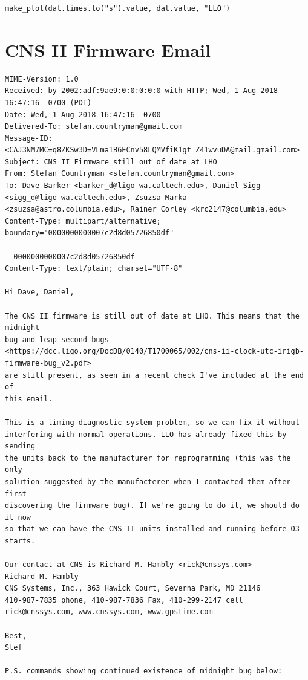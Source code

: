 \documentclass{article}
\begin{document}
\begin{lstlisting}
make_plot(dat.times.to("s").value, dat.value, "LLO")
\end{lstlisting}

\clearpage
\section{CNS II Firmware Email}
\label{sec:cnsiiemail}
\lstset{language=}
\begin{lstlisting}
MIME-Version: 1.0
Received: by 2002:adf:9ae9:0:0:0:0:0 with HTTP; Wed, 1 Aug 2018 16:47:16 -0700 (PDT)
Date: Wed, 1 Aug 2018 16:47:16 -0700
Delivered-To: stefan.countryman@gmail.com
Message-ID: <CAJ3NM7MC=q8ZKSw3D=VLma1B6ECnv58LQMVfiK1gt_Z41wvuDA@mail.gmail.com>
Subject: CNS II Firmware still out of date at LHO
From: Stefan Countryman <stefan.countryman@gmail.com>
To: Dave Barker <barker_d@ligo-wa.caltech.edu>, Daniel Sigg <sigg_d@ligo-wa.caltech.edu>, Zsuzsa Marka <zsuzsa@astro.columbia.edu>, Rainer Corley <krc2147@columbia.edu>
Content-Type: multipart/alternative; boundary="0000000000007c2d8d05726850df"

--0000000000007c2d8d05726850df
Content-Type: text/plain; charset="UTF-8"

Hi Dave, Daniel,

The CNS II firmware is still out of date at LHO. This means that the midnight
bug and leap second bugs
<https://dcc.ligo.org/DocDB/0140/T1700065/002/cns-ii-clock-utc-irigb-firmware-bug_v2.pdf>
are still present, as seen in a recent check I've included at the end of
this email.

This is a timing diagnostic system problem, so we can fix it without
interfering with normal operations. LLO has already fixed this by sending
the units back to the manufacturer for reprogramming (this was the only
solution suggested by the manufacterer when I contacted them after first
discovering the firmware bug). If we're going to do it, we should do it now
so that we can have the CNS II units installed and running before O3 starts.

Our contact at CNS is Richard M. Hambly <rick@cnssys.com>
Richard M. Hambly
CNS Systems, Inc., 363 Hawick Court, Severna Park, MD 21146
410-987-7835 phone, 410-987-7836 Fax, 410-299-2147 cell
rick@cnssys.com, www.cnssys.com, www.gpstime.com

Best,
Stef

P.S. commands showing continued existence of midnight bug below:


\end{lstlisting}
\end{document}
